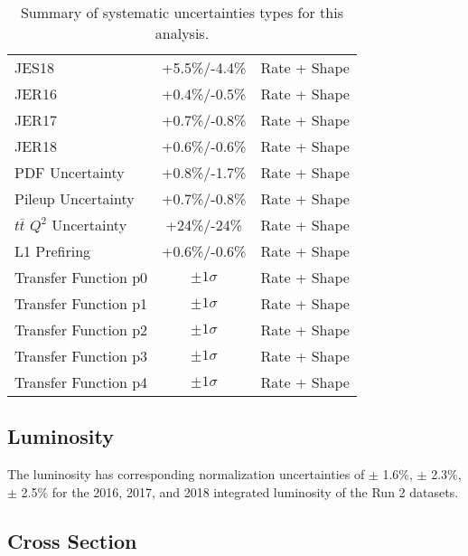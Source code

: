 \begin{table}[!htbp]
\begin{center}
\begin{tabular}{lcc}
            JES18                     & +5.5\%/-4.4\% & Rate + Shape \\
            JER16                      & +0.4\%/-0.5\% & Rate + Shape \\
            JER17                      & +0.7\%/-0.8\% & Rate + Shape \\
            JER18                      & +0.6\%/-0.6\% & Rate + Shape \\
            PDF Uncertainty                               &  +0.8\%/-1.7\% & Rate + Shape \\
            Pileup Uncertainty                            & +0.7\%/-0.8\% & Rate + Shape \\
            $t\bar{t}$ $Q^2$ Uncertainty                  &+24\%/-24\% & Rate + Shape \\
            L1 Prefiring                                      & +0.6\%/-0.6\% & Rate + Shape \\
            Transfer Function p0                      & $\pm 1 \sigma$ & Rate + Shape \\
            Transfer Function p1                      & $\pm 1 \sigma$ & Rate + Shape \\
            Transfer Function p2                      & $\pm 1 \sigma$ & Rate + Shape \\
            Transfer Function p3                      & $\pm 1 \sigma$ & Rate + Shape \\
            Transfer Function p4                      & $\pm 1 \sigma$ & Rate + Shape \\
        \end{tabular}
        \caption{Summary of systematic uncertainties types for this analysis.} 
        \label{tab:syst_table}
    \end{center}
\end{table}


    



\subsection{Luminosity} 

The luminosity has corresponding normalization uncertainties of $\pm$ 1.6\%,  $\pm$ 2.3\%, $\pm$ 2.5\% for the 2016, 2017, and 2018 integrated luminosity of the Run 2 datasets. 

\subsection{Cross Section }


